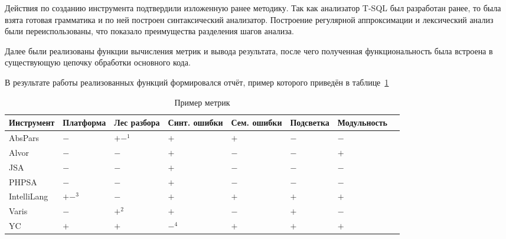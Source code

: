 Действия по созданию инструмента подтвердили изложенную ранее методику. Так как анализатор T-SQL был разработан ранее, то была взята готовая грамматика и по ней построен синтаксический анализатор. Построение регулярной аппроксимации и лексический анализ были переиспользованы, что показало преимущества разделения шагов анализа.

Далее были реализованы функции вычисления метрик и вывода результата, после чего полученная функциональность была встроена в существующую цепочку обработки основного кода.

В результате работы реализованных функций формировался отчёт, пример которого приведён в таблице~\ref{tbl:metrics}

\begin{table} [htbp]
  \centering
  \parbox{14cm}{\caption{Пример метрик}\label{tbl:metrics}}
  \begin{tabular}{| p{2.6cm} || p{2cm} | p{1.8cm} | p{1.8cm} | p{1.8cm} | p{2cm} | p{2cm}l |}
  \hline                               
  \hline
  \small{Инструмент}   &\centering \small{Платформа} &\centering \small{Лес разбора}      &\centering \small{Синт. ошибки} &\centering \small{Сем. ошибки} &\centering \small{Подсветка} &\centering \small{Модульность} & \\
  \hline 
  AbsPars      &\centering  $-$      &\centering  $+-^1$                 &\centering  $+$                  &\centering  $+$                 &\centering  $-$                 &\centering  $-$        & \\
  Alvor        &\centering  $-$      &\centering  $-$                    &\centering  $+$                  &\centering  $-$                 &\centering  $-$                 &\centering  $+$        &\\
  JSA          &\centering  $-$      &\centering  $-$                    &\centering  $+$                  &\centering  $-$                 &\centering  $-$                 &\centering  $-$        &\\
  PHPSA        &\centering  $-$      &\centering  $-$                    &\centering  $+$                  &\centering  $-$                 &\centering  $-$                 &\centering  $-$        &\\
  IntelliLang  &\centering  $+-^3$   &\centering  $-$                    &\centering  $+$                  &\centering  $+$                 &\centering  $+$                 &\centering  $+$        &\\
  Varis        &\centering  $-$      &\centering  $+^2$                  &\centering  $+$                  &\centering  $-$                 &\centering  $+$                 &\centering  $-$        &\\
  YC           &\centering  $+$      &\centering  $+$                    &\centering  $-^4$                &\centering  $+$                 &\centering  $+$                 &\centering  $+$        &\\
  \hline
  \hline
  \end{tabular}
\end{table}

